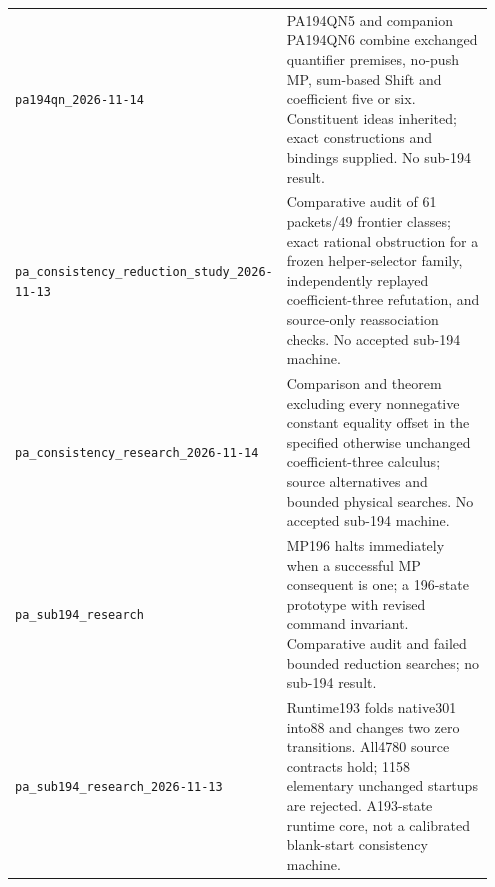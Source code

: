\begin{longtable}{@{}p{0.36\linewidth}p{0.59\linewidth}@{}}
\nolinkurl{pa194qn_2026-11-14} & PA194QN5 and companion PA194QN6 combine exchanged quantifier premises, no-push MP, sum-based Shift and coefficient five or six. Constituent ideas inherited; exact constructions and bindings supplied. No sub-194 result.\\[4pt]
\nolinkurl{pa_consistency_reduction_study_2026-11-13} & Comparative audit of 61 packets/49 frontier classes; exact rational obstruction for a frozen helper-selector family, independently replayed coefficient-three refutation, and source-only reassociation checks. No accepted sub-194 machine.\\[4pt]
\nolinkurl{pa_consistency_research_2026-11-14} & Comparison and theorem excluding every nonnegative constant equality offset in the specified otherwise unchanged coefficient-three calculus; source alternatives and bounded physical searches. No accepted sub-194 machine.\\[4pt]
\nolinkurl{pa_sub194_research} & MP196 halts immediately when a successful MP consequent is one; a 196-state prototype with revised command invariant. Comparative audit and failed bounded reduction searches; no sub-194 result.\\[4pt]
\nolinkurl{pa_sub194_research_2026-11-13} & Runtime193 folds native301 into88 and changes two zero transitions. All4780 source contracts hold; 1158 elementary unchanged startups are rejected. A193-state runtime core, not a calibrated blank-start consistency machine.\\[4pt]
\bottomrule
\end{longtable}
